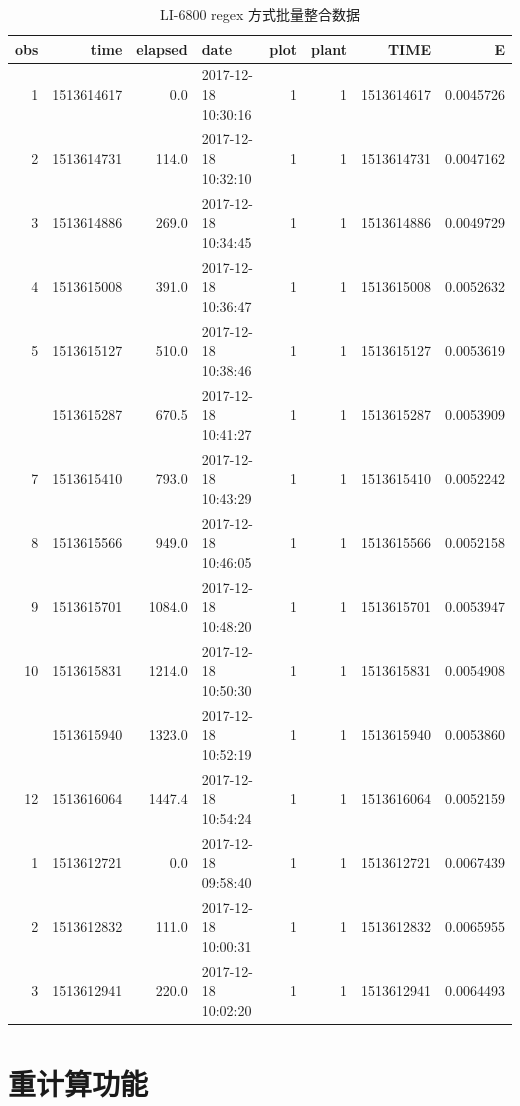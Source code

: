 \documentclass[
]{krantz}
\begin{document}
\begin{table}

\caption{\label{tab:unnamed-chunk-10}LI-6800 regex 方式批量整合数据}
\centering
\begin{tabular}[t]{rrrlrrrr}
\toprule
obs & time & elapsed & date & plot & plant & TIME & E\\
\midrule
1 & 1513614617 & 0.0 & 2017-12-18 10:30:16 & 1 & 1 & 1513614617 & 0.0045726\\
2 & 1513614731 & 114.0 & 2017-12-18 10:32:10 & 1 & 1 & 1513614731 & 0.0047162\\
3 & 1513614886 & 269.0 & 2017-12-18 10:34:45 & 1 & 1 & 1513614886 & 0.0049729\\
4 & 1513615008 & 391.0 & 2017-12-18 10:36:47 & 1 & 1 & 1513615008 & 0.0052632\\
5 & 1513615127 & 510.0 & 2017-12-18 10:38:46 & 1 & 1 & 1513615127 & 0.0053619\\
\addlinespace
6 & 1513615287 & 670.5 & 2017-12-18 10:41:27 & 1 & 1 & 1513615287 & 0.0053909\\
7 & 1513615410 & 793.0 & 2017-12-18 10:43:29 & 1 & 1 & 1513615410 & 0.0052242\\
8 & 1513615566 & 949.0 & 2017-12-18 10:46:05 & 1 & 1 & 1513615566 & 0.0052158\\
9 & 1513615701 & 1084.0 & 2017-12-18 10:48:20 & 1 & 1 & 1513615701 & 0.0053947\\
10 & 1513615831 & 1214.0 & 2017-12-18 10:50:30 & 1 & 1 & 1513615831 & 0.0054908\\
\addlinespace
11 & 1513615940 & 1323.0 & 2017-12-18 10:52:19 & 1 & 1 & 1513615940 & 0.0053860\\
12 & 1513616064 & 1447.4 & 2017-12-18 10:54:24 & 1 & 1 & 1513616064 & 0.0052159\\
1 & 1513612721 & 0.0 & 2017-12-18 09:58:40 & 1 & 1 & 1513612721 & 0.0067439\\
2 & 1513612832 & 111.0 & 2017-12-18 10:00:31 & 1 & 1 & 1513612832 & 0.0065955\\
3 & 1513612941 & 220.0 & 2017-12-18 10:02:20 & 1 & 1 & 1513612941 & 0.0064493\\
\bottomrule
\end{tabular}
\end{table}

\hypertarget{recompute_raw}{%
\section{重计算功能}\label{recompute_raw}}
\end{document}
